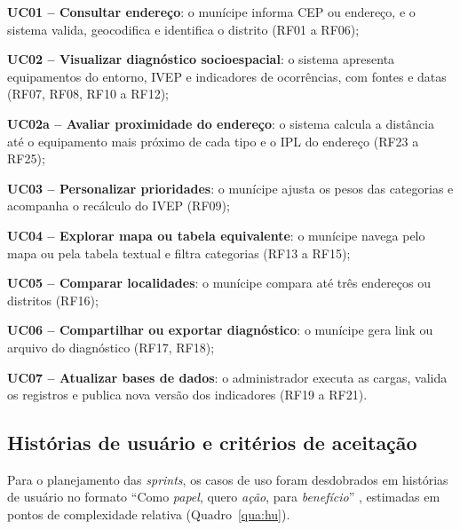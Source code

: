 \begin{alineas}
	\item \textbf{UC01 -- Consultar endereço}: o munícipe informa CEP ou endereço, e o sistema valida, geocodifica e identifica o distrito (RF01 a RF06);
	\item \textbf{UC02 -- Visualizar diagnóstico socioespacial}: o sistema apresenta equipamentos do entorno, IVEP e indicadores de ocorrências, com fontes e datas (RF07, RF08, RF10 a RF12);
	\item \textbf{UC02a -- Avaliar proximidade do endereço}: o sistema calcula a distância até o equipamento mais próximo de cada tipo e o IPL do endereço (RF23 a RF25);
	\item \textbf{UC03 -- Personalizar prioridades}: o munícipe ajusta os pesos das categorias e acompanha o recálculo do IVEP (RF09);
	\item \textbf{UC04 -- Explorar mapa ou tabela equivalente}: o munícipe navega pelo mapa ou pela tabela textual e filtra categorias (RF13 a RF15);
	\item \textbf{UC05 -- Comparar localidades}: o munícipe compara até três endereços ou distritos (RF16);
	\item \textbf{UC06 -- Compartilhar ou exportar diagnóstico}: o munícipe gera link ou arquivo do diagnóstico (RF17, RF18);
	\item \textbf{UC07 -- Atualizar bases de dados}: o administrador executa as cargas, valida os registros e publica nova versão dos indicadores (RF19 a RF21).
\end{alineas}

\subsection{Histórias de usuário e critérios de aceitação}

Para o planejamento das \emph{sprints}, os casos de uso foram desdobrados em histórias de usuário no formato ``Como \emph{papel}, quero \emph{ação}, para \emph{benefício}'' \cite{cohn2004}, estimadas em pontos de complexidade relativa (Quadro~\ref{qua:hu}).

